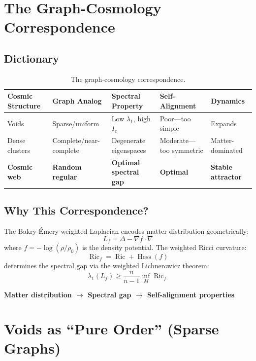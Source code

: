\documentclass[11pt,a4paper]{article}
\theoremstyle{plain}
\theoremstyle{definition}
\theoremstyle{remark}
\newcommand{\Laplacian}{\Delta}
\newcommand{\Ric}{\operatorname{Ric}}
\newcommand{\Hess}{\operatorname{Hess}}
\begin{document}
\section{The Graph-Cosmology Correspondence}

\subsection{Dictionary}

\begin{table}[h]
\centering
\begin{tabular}{@{}lllll@{}}
\toprule
\textbf{Cosmic Structure} & \textbf{Graph Analog} & \textbf{Spectral Property} & \textbf{Self-Alignment} & \textbf{Dynamics} \\
\midrule
Voids & Sparse/uniform & Low $\lambda_1$, high $I_e$ & Poor---too simple & Expands \\
Dense clusters & Complete/near-complete & Degenerate eigenspaces & Moderate---too symmetric & Matter-dominated \\
\textbf{Cosmic web} & \textbf{Random regular} & \textbf{Optimal spectral gap} & \textbf{Optimal} & \textbf{Stable attractor} \\
\bottomrule
\end{tabular}
\caption{The graph-cosmology correspondence.}
\label{tab:correspondence}
\end{table}

\subsection{Why This Correspondence?}

The Bakry-\'{E}mery weighted Laplacian encodes matter distribution geometrically:
\[
L_f = \Laplacian - \nabla f \cdot \nabla
\]
where $f = -\log(\rho/\rho_0)$ is the density potential. The weighted Ricci curvature:
\[
\Ric_f = \Ric + \Hess(f)
\]
determines the spectral gap via the weighted Lichnerowicz theorem:
\[
\lambda_1(L_f) \geq \frac{n}{n-1} \inf_M \Ric_f
\]

\textbf{Matter distribution $\to$ Spectral gap $\to$ Self-alignment properties}

\section{Voids as ``Pure Order'' (Sparse Graphs)}
\end{document}

